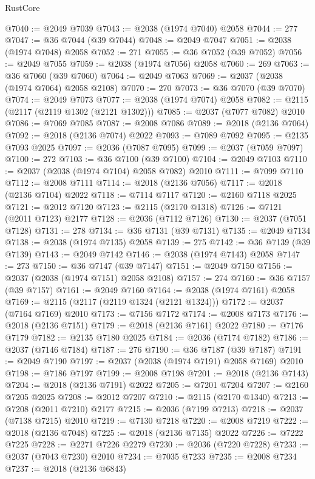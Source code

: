 \begin{lexlean}{RustCore}
\begin{coremodule}
@7040 := @2049 @7039
@7043 := @2038 (@1974 @7040) @2058
@7044 := 277
@7047 := @36 @7044 (@39 @7044)
@7048 := @2049 @7047
@7051 := @2038 (@1974 @7048) @2058
@7052 := 271
@7055 := @36 @7052 (@39 @7052)
@7056 := @2049 @7055
@7059 := @2038 (@1974 @7056) @2058
@7060 := 269
@7063 := @36 @7060 (@39 @7060)
@7064 := @2049 @7063
@7069 := @2037 (@2038 (@1974 @7064) @2058 @2108)
@7070 := 270
@7073 := @36 @7070 (@39 @7070)
@7074 := @2049 @7073
@7077 := @2038 (@1974 @7074) @2058
@7082 := @2115 (@2117 (@2119 @1302 (@2121 @1302)))
@7085 := @2037 (@7077 @7082) @2010
@7086 := @7069 @7085
@7087 := @2008 @7086
@7089 := @2018 (@2136 @7064)
@7092 := @2018 (@2136 @7074) @2022
@7093 := @7089 @7092
@7095 := @2135 @7093 @2025
@7097 := @2036 (@7087 @7095)
@7099 := @2037 (@7059 @7097)
@7100 := 272
@7103 := @36 @7100 (@39 @7100)
@7104 := @2049 @7103
@7110 := @2037 (@2038 (@1974 @7104) @2058 @7082) @2010
@7111 := @7099 @7110
@7112 := @2008 @7111
@7114 := @2018 (@2136 @7056)
@7117 := @2018 (@2136 @7104) @2022
@7118 := @7114 @7117
@7120 := @2160 @7118 @2025
@7121 := @2012 @7120
@7123 := @2115 (@2170 @1318)
@7126 := @7121 (@2011 @7123) @2177
@7128 := @2036 (@7112 @7126)
@7130 := @2037 (@7051 @7128)
@7131 := 278
@7134 := @36 @7131 (@39 @7131)
@7135 := @2049 @7134
@7138 := @2038 (@1974 @7135) @2058
@7139 := 275
@7142 := @36 @7139 (@39 @7139)
@7143 := @2049 @7142
@7146 := @2038 (@1974 @7143) @2058
@7147 := 273
@7150 := @36 @7147 (@39 @7147)
@7151 := @2049 @7150
@7156 := @2037 (@2038 (@1974 @7151) @2058 @2108)
@7157 := 274
@7160 := @36 @7157 (@39 @7157)
@7161 := @2049 @7160
@7164 := @2038 (@1974 @7161) @2058
@7169 := @2115 (@2117 (@2119 @1324 (@2121 @1324)))
@7172 := @2037 (@7164 @7169) @2010
@7173 := @7156 @7172
@7174 := @2008 @7173
@7176 := @2018 (@2136 @7151)
@7179 := @2018 (@2136 @7161) @2022
@7180 := @7176 @7179
@7182 := @2135 @7180 @2025
@7184 := @2036 (@7174 @7182)
@7186 := @2037 (@7146 @7184)
@7187 := 276
@7190 := @36 @7187 (@39 @7187)
@7191 := @2049 @7190
@7197 := @2037 (@2038 (@1974 @7191) @2058 @7169) @2010
@7198 := @7186 @7197
@7199 := @2008 @7198
@7201 := @2018 (@2136 @7143)
@7204 := @2018 (@2136 @7191) @2022
@7205 := @7201 @7204
@7207 := @2160 @7205 @2025
@7208 := @2012 @7207
@7210 := @2115 (@2170 @1340)
@7213 := @7208 (@2011 @7210) @2177
@7215 := @2036 (@7199 @7213)
@7218 := @2037 (@7138 @7215) @2010
@7219 := @7130 @7218
@7220 := @2008 @7219
@7222 := @2018 (@2136 @7048)
@7225 := @2018 (@2136 @7135) @2022
@7226 := @7222 @7225
@7228 := @2271 @7226 @2279
@7230 := @2036 (@7220 @7228)
@7233 := @2037 (@7043 @7230) @2010
@7234 := @7035 @7233
@7235 := @2008 @7234
@7237 := @2018 (@2136 @6843)

\end{coremodule}
\end{lexlean}
